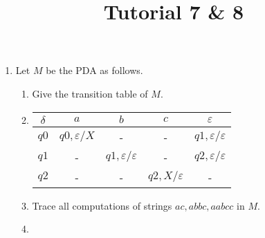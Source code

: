 \documentclass[a4paper, 12pt]{article}
\title{Tutorial 7 & 8}
\date{}
\author{}
\makeatletter
\renewenvironment{proof}[1][\proofname]{\par
  \normalfont \topsep6\p@\@plus6\p@\relax
  \trivlist
  \item[\hskip\labelsep
        \itshape
    #1\@addpunct{.}]\ignorespaces
}{%
  \endtrivlist\@endpefalse
}
\renewcommand{\proofname}{Solution:}
\makeatother
\begin{document}
    \begin{enumerate}
        \item Let $M$ be the PDA as follows.
        
        \begin{center}
        \begin{enumerate}
            \item Give the transition table of $M$.
                \begin{proof}
                    \leavevmode
                    \begin{center}
                        \begin{tabular}{|c|c|c|c|c|}
                            \hline
                            $\delta$ & $a$ & $b$ & $c$ & $\varepsilon$ \\
                            \hline
                            $q0$ & $q0, \varepsilon/X$ & - & - & $q1, \varepsilon/\varepsilon$ \\
                            \hline
                            $q1$ & - & $q1, \varepsilon/\varepsilon$ & - & $q2, \varepsilon/\varepsilon$ \\
                            \hline
                            $q2$ & - & - & $q2, X/\varepsilon$ & - \\
                            \hline
                        \end{tabular}
                    \end{center}
                \end{proof}
            \item Trace all computations of strings $ac, abbc, aabcc$ in $M$.
                \begin{proof}
                    \begin{align*}

\end{align*}
\end{proof}
\end{enumerate}
\end{center}
\end{enumerate}
\end{document}
